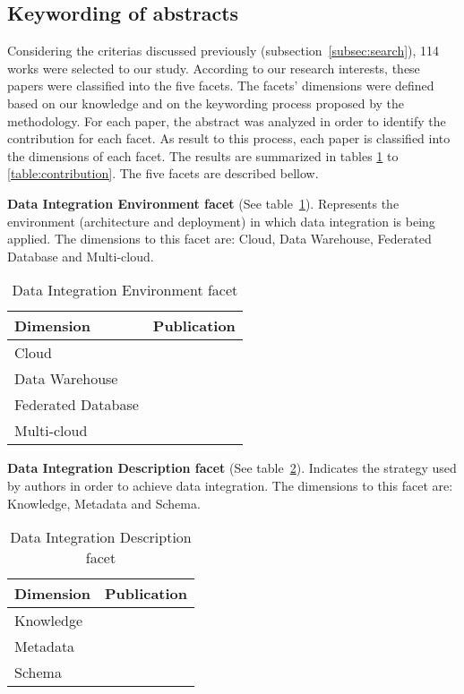 \subsection{Keywording of abstracts}

Considering the criterias discussed previously (subsection~\ref{subsec:search}),
114 works were selected to our study. 
According to our research interests, these papers were classified into the five facets. 
The facets' dimensions were defined based on our knowledge and on the keywording process proposed by the
methodology.   
For each paper, the abstract
was analyzed in order to identify the contribution for each facet.
As result to this process, each paper is classified into the dimensions of each facet. 
The results are summarized in tables \ref{table:dienviron} to \ref{table:contribution}. 
The five facets are described bellow.

\textbf{Data Integration Environment facet} (See table~\ref{table:dienviron}). 
Represents the environment (architecture and deployment) in which data integration is being applied.
The dimensions to this facet are: Cloud, Data Warehouse, Federated Database and Multi-cloud.
\begin{table}[h]
\begin{center}
\begin{tabular}{p{4cm}p{10cm}}
\hline 
\textbf{Dimension} & \textbf{Publication} \\ 
\hline 
Cloud & 
\cite{106,110,105,107,108,109,068,070,072,113,073,074,075,076,077,078,079,081,082,083,085,087,088,089,090,094,095,096,097,098,099,100,102,103}\\ 
\hline 
Data Warehouse & \cite{066,114,091} \\ 
\hline 
Federated Database & \cite{071,089,112} \\ 
\hline 
Multi-cloud & \cite{012,071,093} \\ 
\hline 
\end{tabular}
\end{center}
\caption{Data Integration Environment facet}\label{table:dienviron}
\end{table}

\textbf{Data Integration Description facet} (See table~\ref{table:didesc}).
Indicates the strategy used by authors in order to achieve data integration. 
The dimensions to this facet are: Knowledge, Metadata and Schema.
\begin{table}[h]
\begin{center}
\begin{tabular}{p{4cm}p{10cm}}
\hline 
\textbf{Dimension} & \textbf{Publication} \\ 
\hline 
Knowledge & \cite{012,083} \\ 
\hline 
Metadata & \cite{108,066,113} \\ 
\hline 
Schema & \cite{070,071,072,073,075,114,083,089,091,112,102} \\ 
\hline 
\end{tabular}
\end{center}
\caption{Data Integration Description facet}\label{table:didesc}
\end{table}

